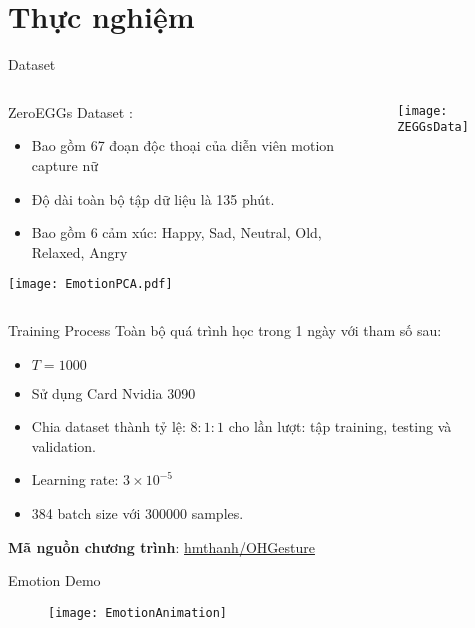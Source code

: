 
\section{Thực nghiệm}

\begin{frame}{Dataset}
	

\begin{columns}
	\begin{column}{0.6\textwidth}
		ZeroEGGs Dataset \cite{ghorbani2023zeroeggs}:
		
		\begin{itemize}
			\item Bao gồm 67 đoạn độc thoại của diễn viên motion capture nữ
			\item Độ dài toàn bộ tập dữ liệu là 135 phút.
			\item Bao  gồm 6 cảm xúc: Happy,  Sad, Neutral, Old, Relaxed, Angry
		\end{itemize}
		\texttt{[image: EmotionPCA.pdf]}
	\end{column}
	
	\begin{column}{0.4\textwidth}
		\texttt{[image: ZEGGsData]}
	\end{column}
\end{columns}
\end{frame}



\begin{frame}{Training Process}
	Toàn bộ quá trình học trong 1 ngày với tham số sau:
\begin{itemize}
	\item $T = 1000$
	\item Sử dụng Card Nvidia 3090
	\item Chia dataset thành tỷ lệ: $8:1:1$ cho lần lượt: tập training, testing và validation.
	\item Learning rate: $3 \times 10^{-5}$
	\item 384 batch size với 300000 samples.
	\end{itemize}
	
	\textbf{Mã nguồn chương trình}: \hyperlink{https://github.com/hmthanh/OHGesture}{hmthanh/OHGesture}
\end{frame}

\begin{frame}{Emotion Demo}
	\begin{figure}
	\texttt{[image: EmotionAnimation]}
\end{figure}
\end{frame}
